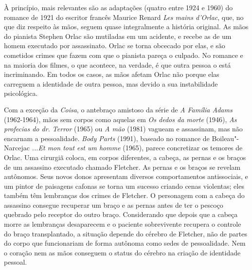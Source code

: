 À princípio, mais relevantes são as adaptações (quatro entre 1924 e
1960) do romance de 1921 do escritor francês Maurice Renard \emph{Les
mains d'Orlac}, que, no que diz respeito às mãos, seguem quase
integralmente a história original. As mãos do pianista Stephen Orlac são
mutiladas em um acidente, e recebe as de um homem executado por
assassinato. Orlac se torna obcecado por elas, e são cometidos crimes
que fazem com que o pianista pareça o culpado. No romance e na maioria
dos filmes, o que acontece, na verdade, é que outra pessoa o está
incriminando. Em todos os casos, as mãos afetam Orlac não porque elas
carreguem a identidade de outra pessoa, mas devido a sua instabilidade
psicológica.

Com a exceção da \emph{Coisa}, o antebraço amistoso da série de 
\emph{A Família Adams} (1962-1964), mãos sem corpos como aquelas em
\emph{Os dedos da morte} (1946), \emph{As profecias do dr. Terror}
(1965) ou \emph{A mão} (1981) vagueam e assassinam, mas não encarnam a
pessoalidade. \emph{Body Parts} (1991), baseado no romance de
Boileau"-Narcejac \emph{...Et mon tout est um homme} (1965), parece
concretizar os temores de Orlac. Uma cirurgiã coloca, em corpos
diferentes, a cabeça, as pernas e os braços de um assassino executado
chamado Fletcher. As pernas e os braços se revelam autônomos. Seus novos
donos apresentam diversos comportamentos antissociais, e um pintor de
paisagens cafonas se torna um sucesso criando cenas violentas; eles
também têm lembranças dos crimes de Fletcher. O personagem com a cabeça
do assassino consegue recuperar um braço e as pernas antes de ter o
pescoço quebrado pelo receptor do outro braço. Considerando que depois
que a cabeça morre as lembranças desaparecem e o paciente sobrevivente
recupera o controle do braço transplantado, a situação depende do
cérebro de Fletcher, não de partes do corpo que funcionariam de forma
autônoma como sedes de pessoalidade. Nem o coração nem as mãos conseguem
o status do cérebro na criação de identidade pessoal.


